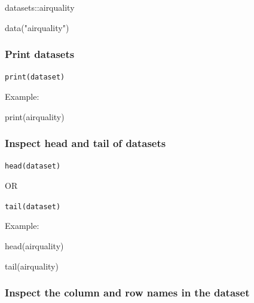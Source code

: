 \documentclass[
  letterpaper,
  DIV=11,
  numbers=noendperiod]{scrreprt}
\newenvironment{Shaded}{}{}
\newcommand{\FunctionTok}[1]{\textcolor[rgb]{0.44,0.26,0.76}{#1}}
\newcommand{\NormalTok}[1]{\textcolor[rgb]{0.14,0.16,0.18}{#1}}
\newcommand{\SpecialCharTok}[1]{\textcolor[rgb]{0.00,0.36,0.77}{#1}}
\newcommand{\StringTok}[1]{\textcolor[rgb]{0.01,0.18,0.38}{#1}}
\begin{document}
\begin{Shaded}
\begin{Highlighting}[]
\NormalTok{datasets}\SpecialCharTok{::}\NormalTok{airquality}
\end{Highlighting}
\end{Shaded}

\begin{Shaded}
\begin{Highlighting}[]
\FunctionTok{data}\NormalTok{(}\StringTok{"airquality"}\NormalTok{)}
\end{Highlighting}
\end{Shaded}

\subsubsection{Print datasets}\label{print-datasets}

\texttt{print(dataset)}

Example:

\begin{Shaded}
\begin{Highlighting}[]
\FunctionTok{print}\NormalTok{(airquality)}
\end{Highlighting}
\end{Shaded}

\subsubsection{Inspect head and tail of
datasets}\label{inspect-head-and-tail-of-datasets}

\texttt{head(dataset)}

OR

\texttt{tail(dataset)}

Example:

\begin{Shaded}
\begin{Highlighting}[]
\FunctionTok{head}\NormalTok{(airquality)}
\end{Highlighting}
\end{Shaded}

\begin{Shaded}
\begin{Highlighting}[]
\FunctionTok{tail}\NormalTok{(airquality)}
\end{Highlighting}
\end{Shaded}

\subsubsection{Inspect the column and row names in the
dataset}\label{inspect-the-column-and-row-names-in-the-dataset}
\end{document}
